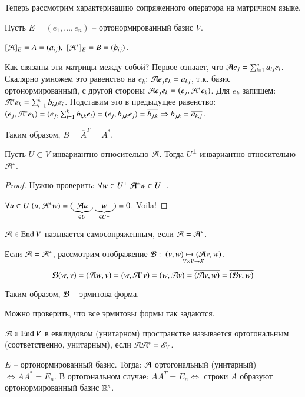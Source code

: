 \documentclass[main]{subfiles}
\begin{document}
Теперь рассмотрим характеризацию сопряженного оператора на матричном языке.

Пусть $E = (e_1, \ldots, e_n)$ -- ортонормированный базис $V$.

$[\mathcal{A}]_E = A = (a_{ij}), \ [\mathcal{A}^*]_E = B = (b_{ij})$.

Как связаны эти матрицы между собой?
Первое ознаает, что $\mathcal{A} e_j = \sum_{i=1}^n a_{ij} e_i$. Скалярно умножем это равенство на $e_k$:
$\mathcal{A} e_j e_k = a_{kj}$, т.к. базис ортонормированный, с другой стороны $\mathcal{A} e_j e_k = (e_j, \mathcal{A}^* e_k)$.
Для $e_k$ запишем: $\mathcal{A}^* e_k = \sum_{i=1}^k b_{i, k} e_i$. Подставим это в предыдущее равенство:
$(e_j, \mathcal{A}^* e_k) = (e_j, \sum_{i=1}^k b_{i, k} e_i) = (e_j, b_{j, k} e_j) = \overline{b_{j, k}} \Rightarrow
    b_{j, k} = \overline{a_{k, j}}$.

Таким образом, $B = \overline{A}^T = A^*$.

\begin{proposition}
    Пусть $U \subset V$ инвариантно относительно $\mathcal{A}$. Тогда $U^{\perp}$ инвариантно относительно $\mathcal{A}^*$.
\end{proposition}

\begin{proof}
    Нужно проверить: $\forall w \in U^{\perp} \ \mathcal{A}^* w \in U^{\perp}$.

    $\forall u \in U \ (u, \mathcal{A}^* w) = (\underbrace{\mathcal{A} u}_{\in U}, \underbrace{w}_{\in U^{\perp}}) = 0$. Voila!
\end{proof}

\begin{definition}
    $\mathcal{A} \in \operatorname{End} V$ называется самосопряженным, если $\mathcal{A} = \mathcal{A}^*$.
\end{definition}

Если  $\mathcal{A} = \mathcal{A}^*$, рассмотрим отображение $\mathcal{B}: \ \underset{V\times V \rightarrow K}{(v, w) \mapsto (\mathcal{A} v, w)}$.
\[\mathcal{B}(w, v) = (\mathcal{A} w, v) = (w, \mathcal{A}^* v) = (w, \mathcal{A} v) = \overline{(\mathcal{A} v, w)} = \overline{(\mathcal{B} v, w)}\]

Таким образом, $\mathcal{B}$ -- эрмитова форма.

Можно проверить, что все эрмитовы формы так задаются.

\begin{definition}
    $\mathcal{A} \in \operatorname{End} V$ в евклидовом (унитарном) пространстве называется ортогональным (соответственно, унитарным),
    если $\mathcal{A} \mathcal{A}^* = \mathscr{E}_V$.
\end{definition}

$E$ -- ортонормированный базис. Тогда: $\mathcal{A}$ ортогональный (унитарный) $\Leftrightarrow AA^* = E_n$.
В ортогональном случае: $AA^T = E_n \Leftrightarrow$ строки $A$ образуют ортонормированный базис $\mathbb{R}^n$.
\end{document}
